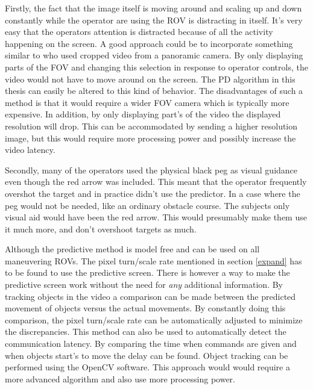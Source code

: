 Firstly, the fact that the image itself is moving around and scaling up and down constantly while the operator are using the ROV is distracting in itself. It's very easy that the operators attention is distracted because of all the activity happening on the screen. A good approach could be to incorporate something similar to \citet{Baldwin1999} who used cropped video from a panoramic camera. By only displaying parts of the FOV and changing this selection in response to operator controls, the video would not have to move around on the screen. The PD algorithm in this thesis can easily be altered to this kind of behavior. The disadvantages of such a method is that it would require a wider FOV camera which is typically more expensive. In addition, by only displaying part's of the video the displayed resolution will drop. This can be accommodated by sending a higher resolution image, but this would require more processing power and possibly increase the video latency.

Secondly, many of the operators used the physical black peg as visual guidance even though the red arrow was included. This meant that the operator frequently overshot the target and in practice didn't use the predictor. In a case where the peg would not be needed, like an ordinary obstacle course. The subjects only visual aid would have been the red arrow. This would presumably make them use it much more, and don't overshoot targets as much.

Although the predictive method is model free and can be used on all maneuvering ROVs. The pixel turn/scale rate mentioned in section \ref{expand} has to be found to use the predictive screen. There is however a way to make the predictive screen work without the need for \textit{any} additional information. By tracking objects in the video a comparison can be made between the predicted movement of objects versus the actual movements. By constantly doing this comparison, the pixel turn/scale rate can be automatically adjusted to minimize the discrepancies. This method can also be used to automatically detect the communication latency. By comparing the time when commands are given and when objects start's to move the delay can be found. Object tracking can be performed using the OpenCV software. This approach would would require a more advanced algorithm and also use more processing power.


